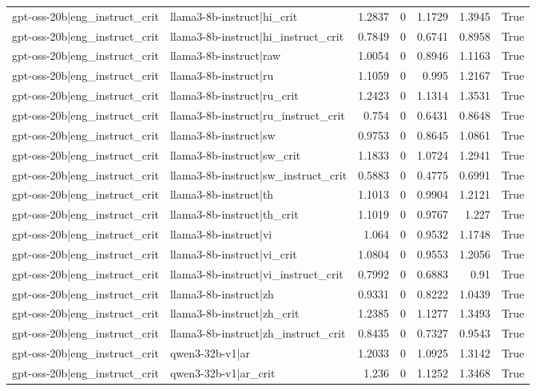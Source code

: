 \begin{table}
\begin{tabular}{l l r r r r l}
gpt-oss-20b|eng_instruct_crit & llama3-8b-instruct|hi_crit & 1.2837 & 0 & 1.1729 & 1.3945 & True \\
gpt-oss-20b|eng_instruct_crit & llama3-8b-instruct|hi_instruct_crit & 0.7849 & 0 & 0.6741 & 0.8958 & True \\
gpt-oss-20b|eng_instruct_crit & llama3-8b-instruct|raw & 1.0054 & 0 & 0.8946 & 1.1163 & True \\
gpt-oss-20b|eng_instruct_crit & llama3-8b-instruct|ru & 1.1059 & 0 & 0.995 & 1.2167 & True \\
gpt-oss-20b|eng_instruct_crit & llama3-8b-instruct|ru_crit & 1.2423 & 0 & 1.1314 & 1.3531 & True \\
gpt-oss-20b|eng_instruct_crit & llama3-8b-instruct|ru_instruct_crit & 0.754 & 0 & 0.6431 & 0.8648 & True \\
gpt-oss-20b|eng_instruct_crit & llama3-8b-instruct|sw & 0.9753 & 0 & 0.8645 & 1.0861 & True \\
gpt-oss-20b|eng_instruct_crit & llama3-8b-instruct|sw_crit & 1.1833 & 0 & 1.0724 & 1.2941 & True \\
gpt-oss-20b|eng_instruct_crit & llama3-8b-instruct|sw_instruct_crit & 0.5883 & 0 & 0.4775 & 0.6991 & True \\
gpt-oss-20b|eng_instruct_crit & llama3-8b-instruct|th & 1.1013 & 0 & 0.9904 & 1.2121 & True \\
gpt-oss-20b|eng_instruct_crit & llama3-8b-instruct|th_crit & 1.1019 & 0 & 0.9767 & 1.227 & True \\
gpt-oss-20b|eng_instruct_crit & llama3-8b-instruct|vi & 1.064 & 0 & 0.9532 & 1.1748 & True \\
gpt-oss-20b|eng_instruct_crit & llama3-8b-instruct|vi_crit & 1.0804 & 0 & 0.9553 & 1.2056 & True \\
gpt-oss-20b|eng_instruct_crit & llama3-8b-instruct|vi_instruct_crit & 0.7992 & 0 & 0.6883 & 0.91 & True \\
gpt-oss-20b|eng_instruct_crit & llama3-8b-instruct|zh & 0.9331 & 0 & 0.8222 & 1.0439 & True \\
gpt-oss-20b|eng_instruct_crit & llama3-8b-instruct|zh_crit & 1.2385 & 0 & 1.1277 & 1.3493 & True \\
gpt-oss-20b|eng_instruct_crit & llama3-8b-instruct|zh_instruct_crit & 0.8435 & 0 & 0.7327 & 0.9543 & True \\
gpt-oss-20b|eng_instruct_crit & qwen3-32b-v1|ar & 1.2033 & 0 & 1.0925 & 1.3142 & True \\
gpt-oss-20b|eng_instruct_crit & qwen3-32b-v1|ar_crit & 1.236 & 0 & 1.1252 & 1.3468 & True \\

\end{tabular}
\end{table}
